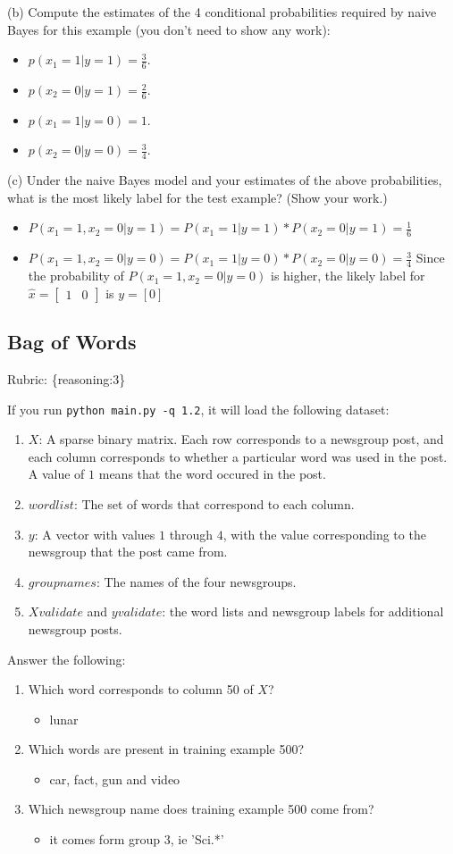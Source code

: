 \documentclass{article}
\def\blu#1{{\color{blu}#1}}
\def\gre#1{{\color{gre}#1}}
\def\items#1{\begin{itemize}#1\end{itemize}}
\def\enum#1{\begin{enumerate}#1\end{enumerate}}
\def\rubric#1{\gre{Rubric: \{#1\}}}{}
\begin{document}
\blu{(b) Compute the estimates of the 4 conditional probabilities required by naive Bayes for this example}  (you don't need to show any work):
\items{
\item $p(x_1 = 1 | y = 1) = \frac{3}{6}$.
\item $p(x_2 = 0 | y = 1)   = \frac{2}{6}$.
\item $p(x_1 = 1 | y = 0) = 1$.
\item $p(x_2 = 0 | y = 0) =  \frac{3}{4}$.
}

\blu{(c) Under the naive Bayes model and your estimates of the above probabilities, what is the most likely label for the test example? (Show your work.)}
\items{
\item $P(x_1 = 1, x_2 = 0 | y = 1) = P(x_1= 1 | y =1 )*P(x_2 = 0 |y = 1) = \frac{1}{6}$
\item $P(x_1 = 1, x_2 = 0 | y = 0) = P(x_1= 1 | y =0 )*P(x_2 = 0 |y = 0) = \frac{3}{4}$
\newline Since the probability of  $P(x_1 = 1, x_2 = 0 | y = 0)$  is higher, the likely label for $\hat{x} = \begin{bmatrix}1 & 0\end{bmatrix}$ is $y = [0]$
}

\subsection{Bag of Words}
\rubric{reasoning:3}

If you run \texttt{python main.py -q 1.2}, it will load the following dataset:
\enum{
\item $X$: A sparse binary matrix. Each row corresponds to a newsgroup post, and each column corresponds to whether a particular word was used in the post. A value of $1$ means that the word occured in the post.
\item $wordlist$: The set of words that correspond to each column.
\item $y$: A vector with values $1$ through $4$, with the value corresponding to the newsgroup that the post came from.
\item $groupnames$: The names of the four newsgroups.
\item $Xvalidate$ and $yvalidate$: the word lists and newsgroup labels for additional newsgroup posts.
}
\blu{Answer the following}:
\enum{
\item Which word corresponds to column 50 of $X$?
\items{
\item lunar
}
\item Which words are present in training example 500?
\items{
\item car, fact, gun and video
}
\item Which newsgroup name does training example 500 come from?
\items{
\item it comes form group 3, ie 'Sci.*'
}
}
	
\end{document}
